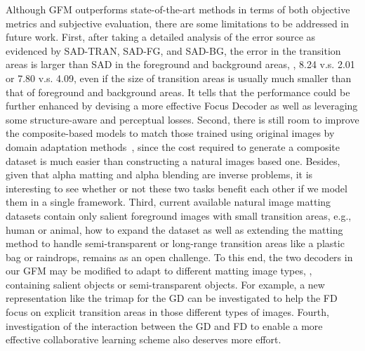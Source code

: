 \documentclass[twocolumn]{svjour3}
\begin{document}
Although GFM outperforms state-of-the-art methods in terms of both objective metrics and subjective evaluation, there are some limitations to be addressed in future work. First, after taking a detailed analysis of the error source as evidenced by SAD-TRAN, SAD-FG, and SAD-BG, the error in the transition areas is larger than SAD in the foreground and background areas, , 8.24 v.s. 2.01 or 7.80 v.s. 4.09, even if the size of transition areas is usually much smaller than that of foreground and background areas. It tells that the performance could be further enhanced by devising a more effective Focus Decoder as well as leveraging some structure-aware and perceptual losses. Second, there is still room to improve the composite-based models to match those trained using original images by domain adaptation methods~\citep{zhang2019category}, since the cost required to generate a composite dataset is much easier than constructing a natural images based one. Besides, given that alpha matting and alpha blending are inverse problems, it is interesting to see whether or not these two tasks benefit each other if we model them in a single framework. Third, current available natural image matting datasets contain only salient foreground images with small transition areas, e.g., human or animal, how to expand the dataset as well as extending the matting method to handle semi-transparent or long-range transition areas like a plastic bag or raindrops, remains as an open challenge. To this end, the two decoders in our GFM may be modified to adapt to different matting image types, , containing salient objects or semi-transparent objects. For example, a new representation like the trimap for the GD can be investigated to help the FD focus on explicit transition areas in those different types of images. Fourth, investigation of the interaction between the GD and FD to enable a more effective collaborative learning scheme also deserves more effort.



\end{document}
